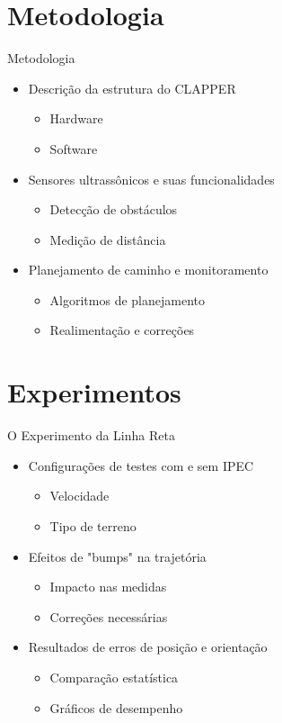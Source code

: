 \documentclass[xcolor=dvipsnames, aspectratio=169]{beamer}
\begin{document}
\section{Metodologia}
\begin{frame}{Metodologia}
  \begin{itemize}
    \item Descrição da estrutura do CLAPPER
      \begin{itemize}
        \item Hardware
        \item Software
      \end{itemize}
    \item Sensores ultrassônicos e suas funcionalidades
      \begin{itemize}
        \item Detecção de obstáculos
        \item Medição de distância
      \end{itemize}
    \item Planejamento de caminho e monitoramento
      \begin{itemize}
        \item Algoritmos de planejamento
        \item Realimentação e correções
      \end{itemize}
  \end{itemize}
\end{frame}

\section{Experimentos}
\begin{frame}{O Experimento da Linha Reta}
  \begin{itemize}
    \item Configurações de testes com e sem IPEC
      \begin{itemize}
        \item Velocidade
        \item Tipo de terreno
      \end{itemize}
    \item Efeitos de "bumps" na trajetória
      \begin{itemize}
        \item Impacto nas medidas
        \item Correções necessárias
      \end{itemize}
    \item Resultados de erros de posição e orientação
      \begin{itemize}
        \item Comparação estatística
        \item Gráficos de desempenho
      \end{itemize}
  \end{itemize}
\end{frame}
\end{document}
